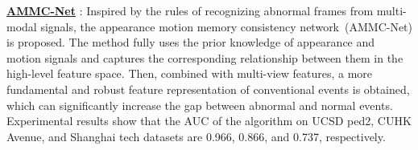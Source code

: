 \documentclass[journal]{IEEEtran}
\begin{document}
\vskip 0.03in
\noindent \underline{\textbf{AMMC-Net}} \cite{cai2021appearance}: Inspired by the rules of recognizing abnormal frames from multi-modal signals, the appearance motion memory consistency network~(AMMC-Net) is proposed. The method fully uses the prior knowledge of appearance and motion signals and captures the corresponding relationship between them in the high-level feature space. Then, combined with multi-view features, a more fundamental and robust feature representation of conventional events is obtained, which can significantly increase the gap between abnormal and normal events. Experimental results show that the AUC of the algorithm on UCSD ped2, CUHK Avenue, and Shanghai tech datasets are 0.966, 0.866, and 0.737, respectively.


\begin{table}[t!]
    \centering
    \caption{Parameter settings}
    \label{hyper}
    \vskip -0.1in
\end{table}
\end{document}
